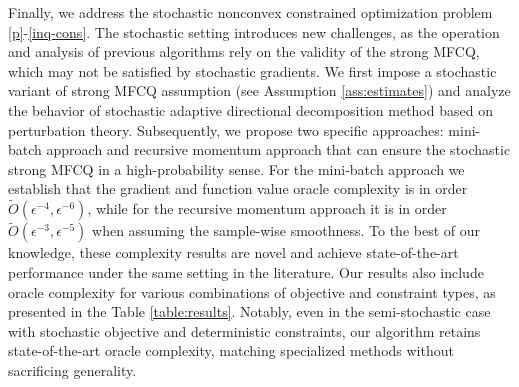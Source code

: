 \documentclass[11pt]{article}
\begin{document}
Finally, we address the  stochastic nonconvex constrained optimization problem \eqref{p}-\eqref{inq-cons}. %
The stochastic setting introduces new challenges, as the operation and analysis of previous algorithms rely on the validity of the strong MFCQ, which {may not be satisfied by stochastic gradients}. We first impose a stochastic {variant of} strong MFCQ assumption (see Assumption \ref{ass:estimates})  and analyze the behavior of stochastic adaptive directional decomposition method based on perturbation theory. Subsequently, we propose two specific approaches: mini-batch approach and recursive momentum approach  that can ensure the stochastic strong MFCQ in a high-probability sense. %
For the mini-batch approach we establish that the  gradient and function value oracle complexity is in order \(\tilde O(\epsilon^{-4}, \epsilon^{-6})\), while for the recursive momentum approach it is in order \(\tilde O(\epsilon^{-3}, \epsilon^{-5})\) when assuming the sample-wise smoothness.  
To the best of our knowledge, these complexity results are novel and achieve state-of-the-art performance under the same setting in the literature. Our results also include oracle complexity for various combinations of objective and constraint types, as presented in the Table \ref{table:results}. Notably, even in the semi-stochastic case  with  stochastic objective and deterministic constraints, our algorithm retains {state-of-the-art} oracle complexity, matching specialized methods \cite{idrees2024constrained,lu2024variance,shi2025momentum} without sacrificing generality.
\end{document}
